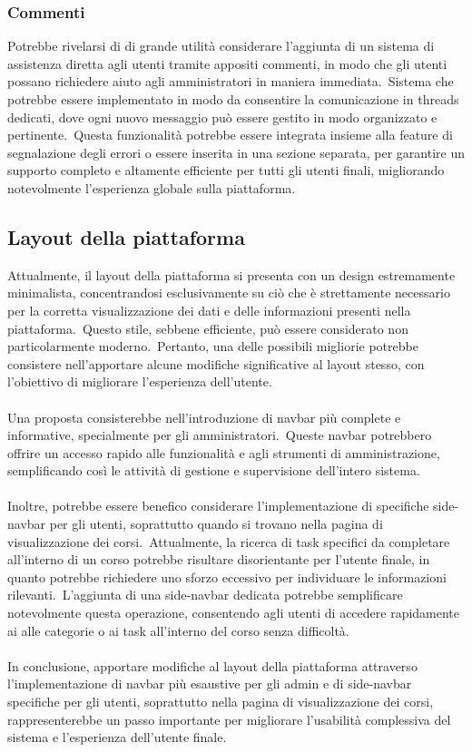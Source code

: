 \subsubsection{Commenti}
Potrebbe rivelarsi di di grande utilità considerare l'aggiunta di un sistema di assistenza diretta agli utenti 
tramite appositi commenti, in modo che gli utenti possano richiedere aiuto agli amministratori in maniera immediata.\ 
Sistema che potrebbe essere implementato in modo da consentire la comunicazione in threads dedicati, dove 
ogni nuovo messaggio può essere gestito in modo organizzato e pertinente.\ 
Questa funzionalità potrebbe essere integrata insieme alla feature di segnalazione degli errori o essere 
inserita in una sezione separata, per garantire un supporto completo e altamente efficiente per tutti gli utenti finali, 
migliorando notevolmente l'esperienza globale sulla piattaforma.
%
\subsection{Layout della piattaforma}\label{sec:cap_sec_subsec}
Attualmente, il layout della piattaforma si presenta con un design estremamente minimalista, 
concentrandosi esclusivamente su ciò che è strettamente necessario per la corretta visualizzazione 
dei dati e delle informazioni presenti nella piattaforma.\ Questo stile, sebbene efficiente, 
può essere considerato non particolarmente moderno.\ Pertanto, una delle possibili migliorie potrebbe 
consistere nell'apportare alcune modifiche significative al layout stesso, con l'obiettivo di migliorare l'esperienza dell'utente.
\\ \\
Una proposta consisterebbe nell'introduzione di navbar più complete e informative, specialmente per gli amministratori.\ 
Queste navbar potrebbero offrire un accesso rapido alle funzionalità e agli strumenti di amministrazione, 
semplificando così le attività di gestione e supervisione dell'intero sistema.
\\ \\
Inoltre, potrebbe essere benefico considerare l'implementazione di specifiche side-navbar per gli utenti, 
soprattutto quando si trovano nella pagina di visualizzazione dei corsi.\ 
Attualmente, la ricerca di task specifici da completare all'interno di un corso potrebbe risultare disorientante per l'utente finale, 
in quanto potrebbe richiedere uno sforzo eccessivo per individuare le informazioni rilevanti.\ 
L'aggiunta di una side-navbar dedicata potrebbe semplificare notevolmente questa operazione, 
consentendo agli utenti di accedere rapidamente ai alle categorie o ai task all'interno del corso senza difficoltà.
\\ \\
In conclusione, apportare modifiche al layout della piattaforma attraverso l'implementazione di navbar 
più esaustive per gli admin e di side-navbar specifiche per gli utenti, soprattutto nella pagina di visualizzazione dei corsi, 
rappresenterebbe un passo importante per migliorare l'usabilità complessiva del sistema e l'esperienza dell'utente finale.
%